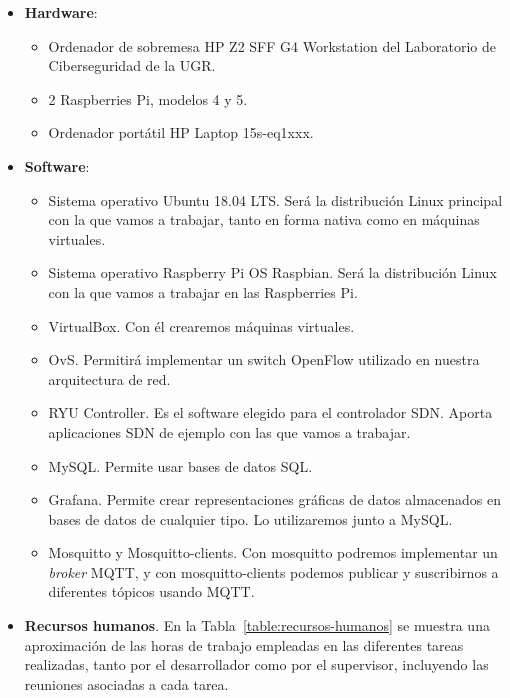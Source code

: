 \begin{itemize}
    \item \textbf{Hardware}:
    
    \begin{itemize}
        \item Ordenador de sobremesa HP Z2 SFF G4 Workstation del Laboratorio de Ciberseguridad de la UGR.
        
        \item 2 Raspberries Pi, modelos 4 y 5.
        
        \item Ordenador portátil HP Laptop 15s-eq1xxx.
    \end{itemize}
        
    \item \textbf{Software}:
        
    \begin{itemize}
        \item Sistema operativo Ubuntu 18.04 LTS. Será la distribución Linux principal con la que vamos a trabajar, tanto en forma nativa como en máquinas virtuales.
        
        \item Sistema operativo Raspberry Pi OS Raspbian. Será la distribución Linux con la que vamos a trabajar en las Raspberries Pi.
        
        \item VirtualBox. Con él crearemos máquinas virtuales.
        
        \item \ac{OvS}. Permitirá implementar un switch OpenFlow utilizado en nuestra arquitectura de red.
        
        \item RYU Controller. Es el software elegido para el controlador SDN. Aporta aplicaciones SDN de ejemplo con las que vamos a trabajar.
        
        \item MySQL. Permite usar bases de datos SQL.
        
        \item Grafana. Permite crear representaciones gráficas de datos almacenados en bases de datos de cualquier tipo. Lo utilizaremos junto a MySQL.
        
        \item Mosquitto y Mosquitto-clients. Con mosquitto podremos implementar un \textit{broker} MQTT, y con mosquitto-clients podemos publicar y suscribirnos a diferentes tópicos usando MQTT.
        
    \end{itemize}
    
    \item \textbf{Recursos humanos}. En la Tabla~\ref{table:recursos-humanos} se muestra una aproximación de las horas de trabajo empleadas en las diferentes tareas realizadas, tanto por el desarrollador como por el supervisor, incluyendo las reuniones asociadas a cada tarea.
\end{itemize}

